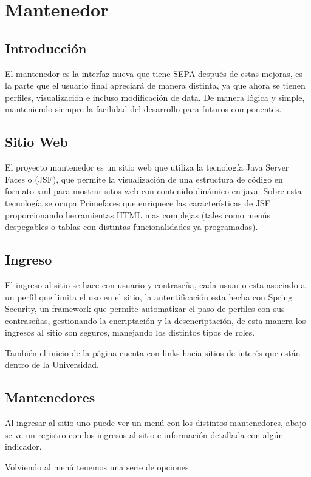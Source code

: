 \documentclass[a4paper,12pt,openany,oneside]{book}
\begin{document}
\chapter{Mantenedor}
\thispagestyle{empty}
\section{Introducción}

El mantenedor es la interfaz nueva que tiene SEPA después de estas mejoras, es la parte que el usuario final apreciará de manera distinta, ya que ahora se tienen perfiles, visualización e incluso modificación de data. De manera lógica y simple, manteniendo siempre la facilidad del desarrollo para futuros componentes.

\section{Sitio Web}
El proyecto mantenedor es un sitio web que utiliza la tecnología Java Server Faces o (JSF), que permite la visualización de una estructura de código en formato xml para mostrar sitos web con contenido dinámico en java. Sobre esta tecnología se ocupa Primefaces que enriquece las características de JSF proporcionando herramientas HTML mas complejas (tales como menús despegables o tablas con distintas funcionalidades ya programadas).
\section{Ingreso}
El ingreso al sitio se hace con usuario y contraseña, cada usuario esta asociado a un perfil que limita el uso en el sitio, la autentificación esta hecha con Spring Security, un framework que permite automatizar el paso de perfiles con sus contraseñas, gestionando la encriptación y la desencriptación, de esta manera los ingresos al sitio son seguros, manejando los distintos tipos de roles.

También el inicio de la página cuenta con links hacia sitios de interés que están dentro de la Universidad.
\section{Mantenedores}
Al ingresar al sitio uno puede ver un menú con los distintos mantenedores, abajo se ve un registro con los ingresos al sitio e información detallada con algún indicador.

Volviendo al menú tenemos una serie de opciones:
\end{document}
